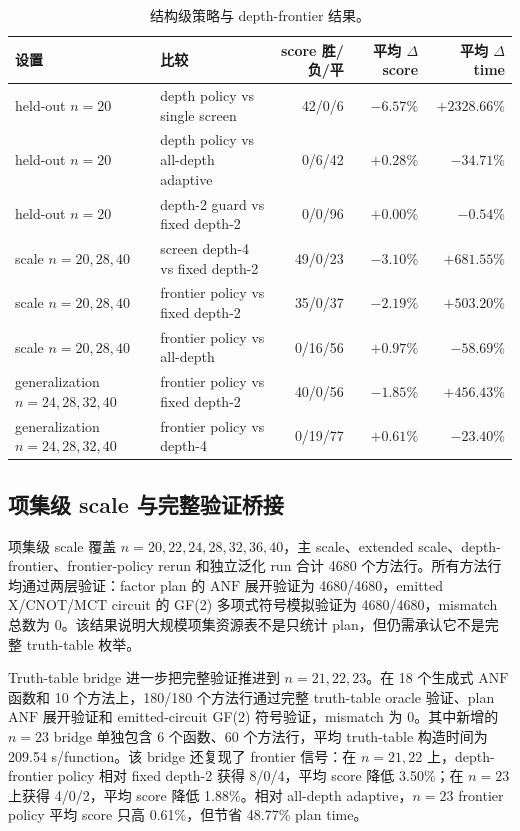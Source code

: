 \documentclass[UTF8,fontset=macnew,11pt]{ctexart}
\newcommand{\anf}{\ensuremath{\mathrm{ANF}}}
\newcommand{\ttable}{truth-table}
\newcommand{\mct}{\ensuremath{\mathrm{MCT}}}
\begin{document}
\begin{table}[H]
\centering
\scriptsize
\caption{结构级策略与 depth-frontier 结果。}
\label{tab:policy}
\begin{tabular}{llrrr}
\toprule
设置 & 比较 & score 胜/负/平 & 平均 $\Delta$ score & 平均 $\Delta$ time \\
\midrule
held-out $n=20$ & depth policy vs single screen & 42/0/6 & $-6.57\%$ & $+2328.66\%$ \\
held-out $n=20$ & depth policy vs all-depth adaptive & 0/6/42 & $+0.28\%$ & $-34.71\%$ \\
held-out $n=20$ & depth-2 guard vs fixed depth-2 & 0/0/96 & $+0.00\%$ & $-0.54\%$ \\
scale $n=20,28,40$ & screen depth-4 vs fixed depth-2 & 49/0/23 & $-3.10\%$ & $+681.55\%$ \\
scale $n=20,28,40$ & frontier policy vs fixed depth-2 & 35/0/37 & $-2.19\%$ & $+503.20\%$ \\
scale $n=20,28,40$ & frontier policy vs all-depth & 0/16/56 & $+0.97\%$ & $-58.69\%$ \\
generalization $n=24,28,32,40$ & frontier policy vs fixed depth-2 & 40/0/56 & $-1.85\%$ & $+456.43\%$ \\
generalization $n=24,28,32,40$ & frontier policy vs depth-4 & 0/19/77 & $+0.61\%$ & $-23.40\%$ \\
\bottomrule
\end{tabular}
\end{table}

\subsection{项集级 scale 与完整验证桥接}

项集级 scale 覆盖 $n=20,22,24,28,32,36,40$，主 scale、extended scale、depth-frontier、frontier-policy rerun 和独立泛化 run 合计 4680 个方法行。所有方法行均通过两层验证：factor plan 的 \anf{} 展开验证为 4680/4680，emitted X/CNOT/\mct{} circuit 的 GF(2) 多项式符号模拟验证为 4680/4680，mismatch 总数为 0。该结果说明大规模项集资源表不是只统计 plan，但仍需承认它不是完整 \ttable{} 枚举。

Truth-table bridge 进一步把完整验证推进到 $n=21,22,23$。在 18 个生成式 \anf{} 函数和 10 个方法上，180/180 个方法行通过完整 \ttable{} oracle 验证、plan \anf{} 展开验证和 emitted-circuit GF(2) 符号验证，mismatch 为 0。其中新增的 $n=23$ bridge 单独包含 6 个函数、60 个方法行，平均 truth-table 构造时间为 209.54 s/function。该 bridge 还复现了 frontier 信号：在 $n=21,22$ 上，depth-frontier policy 相对 fixed depth-2 获得 8/0/4，平均 score 降低 3.50\%；在 $n=23$ 上获得 4/0/2，平均 score 降低 1.88\%。相对 all-depth adaptive，$n=23$ frontier policy 平均 score 只高 0.61\%，但节省 48.77\% plan time。
\end{document}
